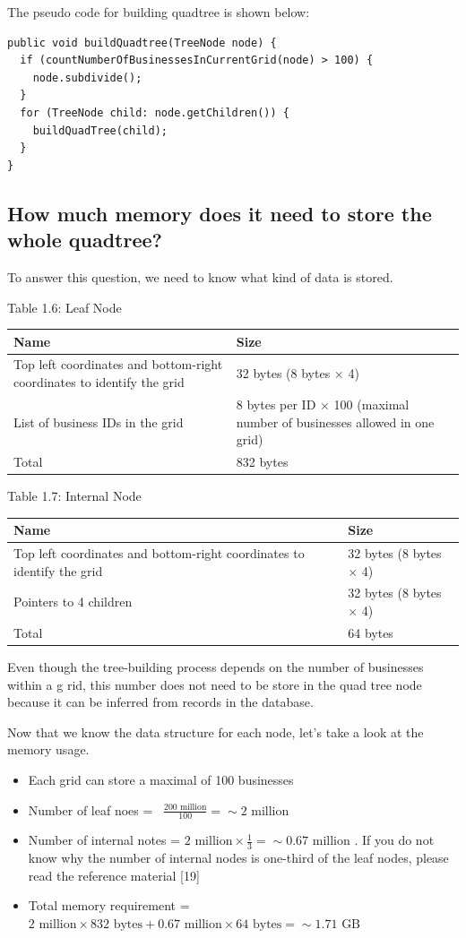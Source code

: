 \documentclass{report}
\theoremstyle{definition}
\let\oldsubsection\subsection
\renewcommand{\subsection}{\oldsubsection*}
\begin{document}
The pseudo code for building quadtree is shown below:

\begin{lstlisting}
public void buildQuadtree(TreeNode node) {
  if (countNumberOfBusinessesInCurrentGrid(node) > 100) {
    node.subdivide();
  }
  for (TreeNode child: node.getChildren()) {
    buildQuadTree(child);
  }
}
\end{lstlisting}

\subsection{How much memory does it need to store the whole quadtree?}

To answer this question, we need to know what kind of data is stored.

Table 1.6: Leaf Node \\
\begin{tabular}{|p{6cm}|p{6cm}|}
\hline
Name & Size \\
\hline
Top left coordinates and bottom-right coordinates to identify the grid & 32 bytes (8 bytes $\times$ 4) \\
\hline
List of business IDs in the grid & 8 bytes per ID $\times$ 100 (maximal number of businesses allowed in one grid)\\
\hline
Total & 832 bytes\\
\hline
\end{tabular}

Table 1.7: Internal Node \\
\begin{tabular}{|p{6cm}|p{6cm}|}
\hline
Name & Size \\
\hline
Top left coordinates and bottom-right coordinates to identify the grid & 32 bytes (8 bytes $\times$ 4) \\
\hline
Pointers to 4 children & 32 bytes (8 bytes $\times$ 4)\\
\hline
Total & 64 bytes\\
\hline
\end{tabular}

Even though the tree-building process depends on the number of businesses within a g rid, this number does not need to be store in the quad tree node because it can be inferred from records in the database.

Now that we know the data structure for each node, let's take a look at the memory usage.

\begin{itemize}
\item
Each grid can store a maximal of 100 businesses
\item
Number of leaf noes =~ $\frac{200 \text{ million}}{100} =\sim 2 \text{ million }$
\item
Number of internal notes = $2 \text{ million} \times \frac{1}{3} =\sim 0.67 \text{ million }$. If you do not know why
the number of internal nodes is one-third of the leaf nodes, please read the reference material [19]
\item
Total memory requirement = $2 \text{ million} \times 832 \text{ bytes} + 0.67 \text{ million} \times 64 \text{ bytes} =\sim 1.71 \text{ GB}$
\end{itemize}
\end{document}
